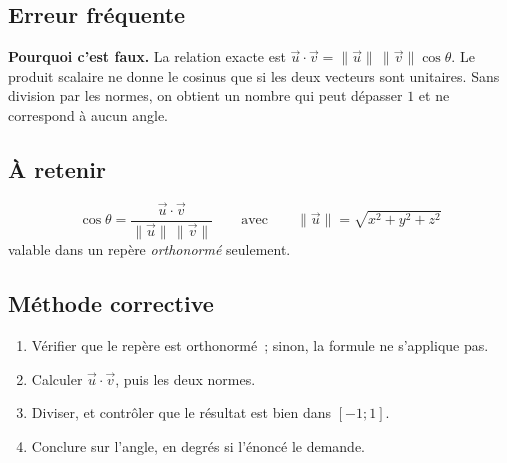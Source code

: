 

\subsection*{Erreur fréquente}


\textbf{Pourquoi c'est faux.} La relation exacte est
$\vec{u}\cdot\vec{v}=\lVert\vec{u}\rVert\,\lVert\vec{v}\rVert\cos\theta$. Le
produit scalaire ne donne le cosinus que si les deux vecteurs sont unitaires.
Sans division par les normes, on obtient un nombre qui peut dépasser $1$ et ne
correspond à aucun angle.


\subsection*{À retenir}

\[
  \cos\theta=\frac{\vec{u}\cdot\vec{v}}
                  {\lVert\vec{u}\rVert\,\lVert\vec{v}\rVert}
  \qquad\text{avec}\qquad
  \lVert\vec{u}\rVert=\sqrt{x^2+y^2+z^2}
\]
valable dans un repère \emph{orthonormé} seulement.

\subsection*{Méthode corrective}

\begin{enumerate}
  \item Vérifier que le repère est orthonormé~; sinon, la formule ne s'applique pas.
  \item Calculer $\vec{u}\cdot\vec{v}$, puis les deux normes.
  \item Diviser, et contrôler que le résultat est bien dans $[-1;1]$.
  \item Conclure sur l'angle, en degrés si l'énoncé le demande.
\end{enumerate}


